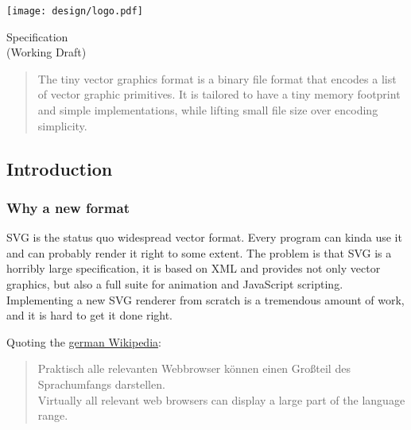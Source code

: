 \documentclass[]{article}
\begin{document}
\begin{titlepage}
  \begin{center}    
    \vspace*{1cm}

    \texttt{[image: design/logo.pdf]}

    \vspace*{1cm}

    \Huge Specification\\
    \vspace{0.5cm}
    \LARGE (Working Draft)
        
    \vfill
        
    \begin{abstract}
    \Large
    The tiny vector graphics format is a binary file
    format that encodes a list of vector graphic primitives. It is tailored
    to have a tiny memory footprint and simple implementations, while
    lifting small file size over encoding simplicity.
    \end{abstract}
        
    \vspace{0.8cm}
  \end{center}
\end{titlepage}

\hypertarget{introduction}{\subsection{Introduction}\label{introduction}}

\hypertarget{why-a-new-format}{\subsubsection{Why a new format}\label{why-a-new-format}}

SVG is the status quo widespread vector format. Every program can kinda
use it and can probably render it right to some extent. The problem is
that SVG is a horribly large specification, it is based on XML and
provides not only vector graphics, but also a full suite for animation
and JavaScript scripting. Implementing a new SVG renderer from scratch
is a tremendous amount of work, and it is hard to get it done right.

Quoting the \href{https://de.wikipedia.org/wiki/Scalable_Vector_Graphics}{german Wikipedia}:

\begin{quote}
Praktisch alle relevanten Webbrowser können einen Großteil des
Sprachumfangs darstellen.\\
Virtually all relevant web browsers can display a large part of the
language range.
\end{quote}
\end{document}
